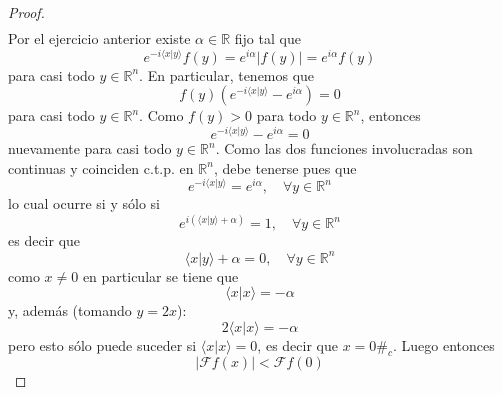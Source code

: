 \documentclass[12pt]{report}
\newcounter{it}
\theoremstyle{largebreak}
\newcommand\abs[1]{\ensuremath{\left|#1\right|}}
\newcommand\pint[2]{\ensuremath{\langle#1| #2\rangle}}
\newcommand{\fou}[1]{\ensuremath{\mathcal{F}#1}}
\newcommand{\contradiction}{\ensuremath{\#_c}}
\begin{document}
\begin{proof}
\begin{equation*}
\begin{split}
            \end{split}
        \end{equation*}
        Por el ejercicio anterior existe $\alpha\in\mathbb{R}$ fijo tal que
        \begin{equation*}
            e^{ -i\pint{x}{y}}f(y)=e^{ i\alpha}\abs{f(y)}=e^{ i\alpha}f(y)
        \end{equation*}
        para casi todo $y\in\mathbb{R}^n$. En particular, tenemos que
        \begin{equation*}
            f(y)\left(e^{-i\pint{x}{y}}-e^{i\alpha}\right)=0
        \end{equation*}
        para casi todo $y\in\mathbb{R}^n$. Como $f(y)>0$ para todo $y\in\mathbb{R}^n$, entonces
        \begin{equation*}
            e^{-i\pint{x}{y}}-e^{i\alpha}=0
        \end{equation*}
        nuevamente para casi todo $y\in\mathbb{R}^n$. Como las dos funciones involucradas son continuas y coinciden c.t.p. en $\mathbb{R}^n$, debe tenerse pues que
        \begin{equation*}
            e^{-i\pint{x}{y}}=e^{i\alpha},\quad\forall y\in\mathbb{R}^n
        \end{equation*}
        lo cual ocurre si y sólo si
        \begin{equation*}
            e^{i(\pint{x}{y}+\alpha)}=1,\quad\forall y\in\mathbb{R}^n
        \end{equation*}
        es decir que
        \begin{equation*}
            \pint{x}{y}+\alpha=0,\quad\forall y\in\mathbb{R}^n
        \end{equation*}
        como $x\neq0$ en particular se tiene que
        \begin{equation*}
            \pint{x}{x}=-\alpha
        \end{equation*}
        y, además (tomando $y=2x$):
        \begin{equation*}
            2\pint{x}{x}=-\alpha
        \end{equation*}
        pero esto sólo puede suceder si $\pint{x}{x}=0$, es decir que $x=0$\contradiction. Luego entonces
        \begin{equation*}
            \abs{\fou{f}(x)}<\fou{f}(0)
        \end{equation*}
    \end{proof}
\end{document}
